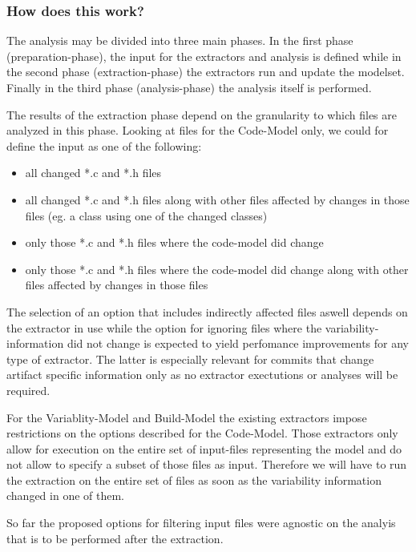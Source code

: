 \documentclass[a4paper]{article}
\begin{document}
\subsubsection{How does this work?}

The analysis may be divided into three main phases. In the first phase (preparation-phase), the input for the extractors and analysis is defined while in the second phase (extraction-phase) the extractors run and update the modelset. Finally in the third phase (analysis-phase) the analysis itself is performed. 

The results of the extraction phase depend on the granularity to which files are analyzed in this phase. Looking at files for the Code-Model only, we could for define the input as one of the following:

\begin{itemize}
	\item all changed *.c and *.h files
	\item all changed *.c and *.h files along with other files affected by changes in those files (eg. a class using one of the changed classes)
	\item only those *.c and *.h files where the code-model did change
	\item only those *.c and *.h files where the code-model did change along with other files affected by changes in those files
\end{itemize}

The selection of an option that includes indirectly affected files aswell depends on the extractor in use while the option for ignoring files where the variability-information did not change is expected to yield perfomance improvements for any type of extractor. The latter is especially relevant for commits that change artifact specific information only as no extractor exectutions or analyses will be required.

For the Variablity-Model and Build-Model the existing extractors impose restrictions on the options described for the Code-Model. Those extractors only allow for execution on the entire set of input-files representing the model and do not allow to specify a subset of those files as input. Therefore we will have to run the extraction on the entire set of files as soon as the variability information changed in one of them.

So far the proposed options for filtering input files were agnostic on the analyis that is to be performed after the extraction.
\end{document}

